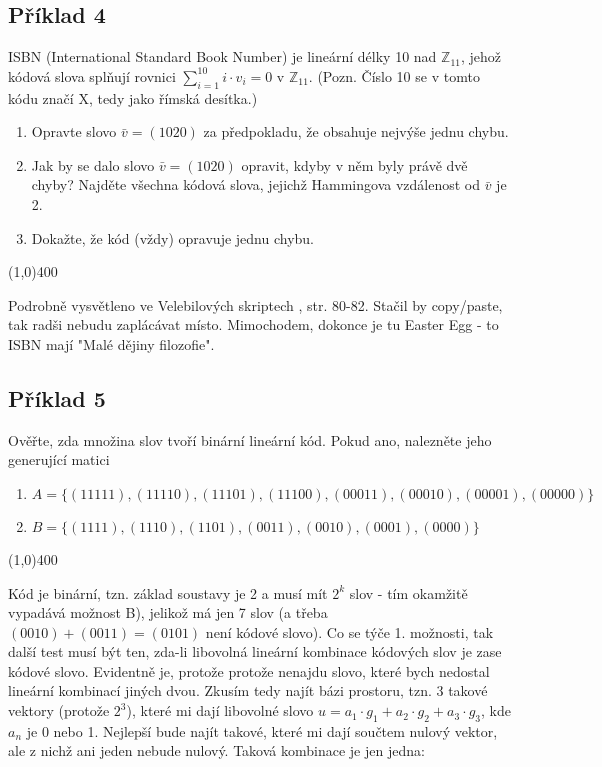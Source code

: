 \documentclass{article}
\begin{document}
\subsection{Příklad 4}
ISBN (International Standard Book Number) je lineární délky 10 nad $\mathbb{Z}_{11}$, jehož kódová slova splňují rovnici $\sum_{i=1}^{10}{i\cdot v_i = 0 \mbox{ v } \mathbb{Z}_{11}}$. (Pozn. Číslo 10 se v tomto kódu značí X, tedy jako římská desítka.)

\begin{enumerate}
	\item Opravte slovo $\bar{v} = (1020)$ za předpokladu, že obsahuje nejvýše jednu chybu.
	\item Jak by se dalo slovo $\bar{v} = (1020)$ opravit, kdyby v něm byly právě dvě chyby? Najděte všechna kódová slova, jejichž Hammingova vzdálenost od $\bar{v}$ je 2.
	\item Dokažte, že kód (vždy) opravuje jednu chybu.
\end{enumerate}

\line(1,0){400}

Podrobně vysvětleno ve Velebilových skriptech \cite{velebil}, str. 80-82. Stačil by copy/paste, tak radši nebudu zaplácávat místo. Mimochodem, dokonce je tu Easter Egg - to ISBN mají "Malé dějiny filozofie".

\subsection{Příklad 5}
Ověřte, zda množina slov tvoří binární lineární kód. Pokud ano, nalezněte jeho generující matici

\begin{enumerate}
	\item $A = \{(11111),(11110),(11101),(11100),(00011),(00010),(00001),(00000)\}$
	\item $B = \{(1111),(1110),(1101),(0011),(0010),(0001),(0000)\}$
\end{enumerate}

\line(1,0){400}

Kód je binární, tzn. základ soustavy je 2 a musí mít $2^k$ slov - tím okamžitě vypadává možnost B), jelikož má jen 7 slov (a třeba $(0010)+(0011)=(0101)$ není kódové slovo). Co se týče 1. možnosti, tak další test musí být ten, zda-li libovolná lineární kombinace kódových slov je zase kódové slovo. Evidentně je, protože protože nenajdu slovo, které bych nedostal lineární kombinací jiných dvou. Zkusím tedy najít bázi prostoru, tzn. 3 takové vektory (protože $2^3$), které mi dají libovolné slovo $u = a_1 \cdot g_1 + a_2 \cdot g_2 + a_3 \cdot g_3$, kde $a_n$ je 0 nebo 1. Nejlepší bude najít takové, které mi dají součtem nulový vektor, ale z nichž ani jeden nebude nulový. Taková kombinace je jen jedna:
\end{document}
